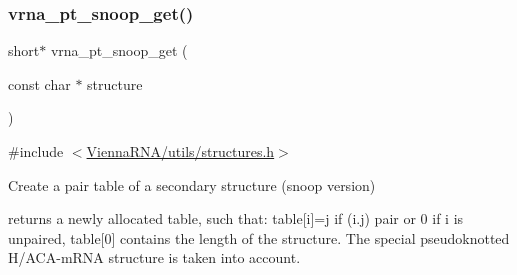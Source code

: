 \subsubsection{\texorpdfstring{vrna\+\_\+pt\+\_\+snoop\+\_\+get()}{vrna\_pt\_snoop\_get()}}
{\footnotesize\ttfamily short$\ast$ vrna\+\_\+pt\+\_\+snoop\+\_\+get (\begin{DoxyParamCaption}\item[{const char $\ast$}]{structure }\end{DoxyParamCaption})}



{\ttfamily \#include $<$\hyperlink{utils_2structures_8h}{Vienna\+R\+N\+A/utils/structures.\+h}$>$}



Create a pair table of a secondary structure (snoop version) 

returns a newly allocated table, such that\+: table\mbox{[}i\mbox{]}=j if (i.\+j) pair or 0 if i is unpaired, table\mbox{[}0\mbox{]} contains the length of the structure. The special pseudoknotted H/\+A\+C\+A-\/m\+R\+NA structure is taken into account. 